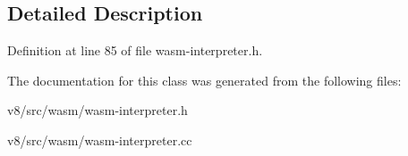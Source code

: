 \subsection{Detailed Description}


Definition at line 85 of file wasm-\/interpreter.\+h.



The documentation for this class was generated from the following files\+:\begin{DoxyCompactItemize}
\item 
v8/src/wasm/wasm-\/interpreter.\+h\item 
v8/src/wasm/wasm-\/interpreter.\+cc\end{DoxyCompactItemize}
